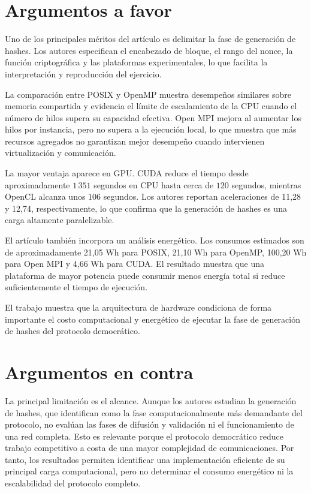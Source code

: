\documentclass[spanish,11pt]{article}
\begin{document}
\section{Argumentos a favor}\label{argumentos-a-favor}

Uno de los principales méritos del artículo es delimitar la fase de generación 
de hashes. Los autores especifican el encabezado de bloque, el rango del nonce, la función 
criptográfica y las plataformas experimentales, lo que facilita la interpretación y 
reproducción del ejercicio.

La comparación entre POSIX y OpenMP muestra desempeños similares sobre memoria compartida y 
evidencia el límite de escalamiento de la CPU cuando el número de hilos supera su capacidad efectiva. 
Open MPI mejora al aumentar los hilos por instancia, pero no supera a la ejecución local, 
lo que muestra que más recursos agregados no garantizan mejor desempeño cuando intervienen 
virtualización y comunicación.

La mayor ventaja aparece en GPU. CUDA reduce el tiempo desde aproximadamente \(1\,351\) 
segundos en CPU hasta cerca de \(120\) segundos, mientras OpenCL alcanza unos \(106\) segundos. 
Los autores reportan aceleraciones de 11,28 y 12,74, respectivamente, lo que confirma que 
la generación de hashes es una carga altamente paralelizable.

El artículo también incorpora un análisis energético. Los consumos estimados son 
de aproximadamente 21,05 Wh para POSIX, 21,10 Wh para OpenMP, 100,20 Wh para Open MPI y 4,66 Wh 
para CUDA. El resultado muestra que una plataforma de mayor potencia puede consumir 
menos energía total si reduce suficientemente el tiempo de ejecución.

El trabajo muestra que la arquitectura de hardware condiciona 
de forma importante el costo computacional y energético de ejecutar la fase de 
generación de hashes del protocolo democrático.

\section{Argumentos en contra}\label{argumentos-en-contra}

La principal limitación es el alcance. Aunque los autores
estudian la generación de hashes, que identifican como la fase
computacionalmente más demandante del protocolo, no evalúan las fases de
difusión y validación ni el funcionamiento de una red completa. Esto es
relevante porque el protocolo democrático reduce trabajo competitivo a
costa de una mayor complejidad de comunicaciones. Por tanto, los
resultados permiten identificar una implementación eficiente de su
principal carga computacional, pero no determinar el consumo energético
ni la escalabilidad del protocolo completo.
\end{document}
